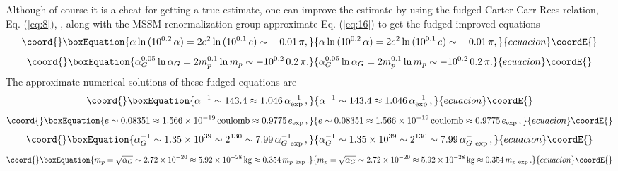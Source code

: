 \documentclass[a4paper,12pt]{article}
\begin{document}
	Although of course it is a cheat
for getting a true estimate,
one can improve the estimate by using
the fudged Carter-Carr-Rees relation, Eq. (\ref{eq:8}),
\coordHE{},
along with the MSSM renormalization group approximate
Eq. (\ref{eq:16}) to get the fudged improved equations
 \begin{equation}\coord{}\boxEquation{
 \alpha\ln{(10^{0.2}\,\alpha)} = 2 e^2\ln{(10^{0.1}\,e)}
  \sim -\,0.01\,\pi,
 \label{eq:29}
 }{
 \alpha\ln{(10^{0.2}\,\alpha)} = 2 e^2\ln{(10^{0.1}\,e)}
  \sim -\,0.01\,\pi,
 }{ecuacion}\coordE{}\end{equation}
 \begin{equation}\coord{}\boxEquation{
 \alpha_G^{0.05}\ln{\alpha_G} = 2 m_p^{0.1}\ln{m_p}
                     \sim -10^{0.2}\,0.2\,\pi.
 \label{eq:30}
 }{
 \alpha_G^{0.05}\ln{\alpha_G} = 2 m_p^{0.1}\ln{m_p}
                     \sim -10^{0.2}\,0.2\,\pi.
 }{ecuacion}\coordE{}\end{equation}
The approximate numerical solutions of these fudged equations are
 \begin{equation}\coord{}\boxEquation{
 \alpha^{-1} \sim 143.4 \approx 1.046\,\alpha_{\mathrm{exp}}^{-1}\,,
 \label{eq:31}
 }{
 \alpha^{-1} \sim 143.4 \approx 1.046\,\alpha_{\mathrm{exp}}^{-1}\,,
 }{ecuacion}\coordE{}\end{equation}
 \begin{equation}\coord{}\boxEquation{
 e \sim 0.08351 \approx 1.566 \times 10^{-19} \, \mathrm{coulomb}
   \approx 0.9775 \, e_{\mathrm{exp}}\,,
 \label{eq:32}
 }{
 e \sim 0.08351 \approx 1.566 \times 10^{-19} \, \mathrm{coulomb}
   \approx 0.9775 \, e_{\mathrm{exp}}\,,
 }{ecuacion}\coordE{}\end{equation}
 \begin{equation}\coord{}\boxEquation{
 \alpha_G^{-1} \sim 1.35 \times 10^{39} \sim 2^{130}
 \sim 7.99 \, \alpha_{G\ \mathrm{exp}}^{-1}\,,
 \label{eq:33}
 }{
 \alpha_G^{-1} \sim 1.35 \times 10^{39} \sim 2^{130}
 \sim 7.99 \, \alpha_{G\ \mathrm{exp}}^{-1}\,,
 }{ecuacion}\coordE{}\end{equation}
 \begin{equation}\coord{}\boxEquation{
 m_p = \sqrt{\alpha_G} \sim 2.72 \times 10^{-20}
 \approx 5.92 \times 10^{-28} \, \mathrm{kg}
 \approx 0.354 \, m_{p\ \mathrm{exp}}\,.
 \label{eq:34}
 }{
 m_p = \sqrt{\alpha_G} \sim 2.72 \times 10^{-20}
 \approx 5.92 \times 10^{-28} \, \mathrm{kg}
 \approx 0.354 \, m_{p\ \mathrm{exp}}\,.
 }{ecuacion}\coordE{}\end{equation}
\end{document}
